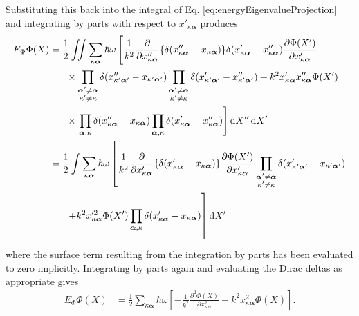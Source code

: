 \documentclass{article}
\numberwithin{equation}{section}
\begin{document}
Substituting this back into the integral of Eq. \eqref{eq:energyEigenvalueProjection} and integrating by parts with respect to $x'_{\kappa\bm{\alpha}}$ produces
\begin{equation}
\begin{split}
E_\Phi\Phi(X) &= \frac{1}{2}\iint\sum_{\kappa\bm{\alpha}}\hbar\omega\left[ \vphantom{\prod_{\bm{\alpha},\kappa}} \frac{1}{k^2}\frac{\partial}{\partial x''_{\kappa\bm{\alpha}}}\{\delta(x''_{\kappa\bm{\alpha}} - x_{\kappa\bm{\alpha}})\}\delta(x'_{\kappa\bm{\alpha}} - x''_{\kappa\bm{\alpha}})\frac{\partial\Phi(X')}{\partial x'_{\kappa\bm{\alpha}}}\right.\\
&\hspace{0.05\textwidth}\times\prod_{\substack{\bm{\alpha}'\neq\bm{\alpha}\\\kappa'\neq\kappa}}\delta(x''_{\kappa'\bm{\alpha}'} - x_{\kappa'\bm{\alpha}'})\prod_{\substack{\bm{\alpha}'\neq\bm{\alpha}\\\kappa'\neq\kappa}}\delta(x'_{\kappa'\bm{\alpha}'} - x''_{\kappa'\bm{\alpha}'}) + k^2x'_{\kappa\bm{\alpha}}x''_{\kappa\bm{\alpha}}\Phi(X')\\
&\hspace{0.05\textwidth}\times\left.\prod_{\bm{\alpha},\kappa}\delta(x''_{\kappa\bm{\alpha}} - x_{\kappa\bm{\alpha}})\prod_{\bm{\alpha},\kappa}\delta(x'_{\kappa\bm{\alpha}} - x''_{\kappa\bm{\alpha}})\right]\mathrm{d}X''\,\mathrm{d}X'\\
&=  \frac{1}{2}\int\sum_{\kappa\bm{\alpha}}\hbar\omega\left[\frac{1}{k^2}\frac{\partial}{\partial x'_{\kappa\bm{\alpha}}}\{\delta(x'_{\kappa\bm{\alpha}} - x_{\kappa\bm{\alpha}})\}\frac{\partial\Phi(X')}{\partial x'_{\kappa\bm{\alpha}}}\prod_{\substack{\bm{\alpha}'\neq\bm{\alpha}\\\kappa'\neq\kappa}}\delta(x'_{\kappa'\bm{\alpha}'} - x_{\kappa'\bm{\alpha}'})\right.\\
&\hspace{0.05\textwidth}\left. + k^2x'^2_{\kappa\bm{\alpha}}\Phi(X')\prod_{\bm{\alpha},\kappa}\delta(x'_{\kappa\bm{\alpha}} - x_{\kappa\bm{\alpha}}) \vphantom{\prod_{\substack{\bm{\alpha}\neq\bm{\alpha}'\\\kappa\neq\kappa'}}} \right]\mathrm{d}X'\\
\end{split}
\end{equation}
where the surface term resulting from the integration by parts has been evaluated to zero implicitly. Integrating by parts again and evaluating the Dirac deltas as appropriate gives
\begin{equation}\label{eq:energyEigenvalue2}
\begin{split}
E_\Phi\Phi(X) &= \frac{1}{2}\sum_{\kappa\bm{\alpha}}\hbar\omega\left[-\frac{1}{k^2}\frac{\partial^2\Phi(X)}{\partial x_{\kappa\bm{\alpha}}^2} + k^2x_{\kappa\bm{\alpha}}^2\Phi(X)\right].
\end{split}
\end{equation}
\end{document}
